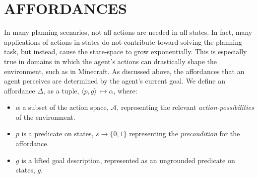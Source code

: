 \documentclass[]{article}
\begin{document}
%




\section{AFFORDANCES}
\label{sec:affordances}

In many planning scenarios, not all actions are needed in all
states. In fact, many applications of actions in states do not
contribute toward solving the planning task, but instead, cause the
state-space to grow exponentially. This is especially true in domains in which
the agent's actions can drastically shape the environment, such as in
Minecraft. As discussed above, the affordances that an 
agent perceives are determined by the agent's current goal. We define an affordance $\Delta$, 
as a tuple, $\langle p,g\rangle\ \longmapsto \alpha$,
where:
\begin{itemize}
\item[] $\alpha$ a subset of the action space, $\mathcal{A}$, representing the relevant {\it action-possibilities} of the environment.
\item[] $p$ is a predicate on states, $s \longrightarrow \{$0$, 1\}$
  representing the {\em precondition} for the affordance.
\item[] $g$ is a lifted goal description, represented as an ungrounded predicate on states, $g$.
\end{itemize}
\end{document}
